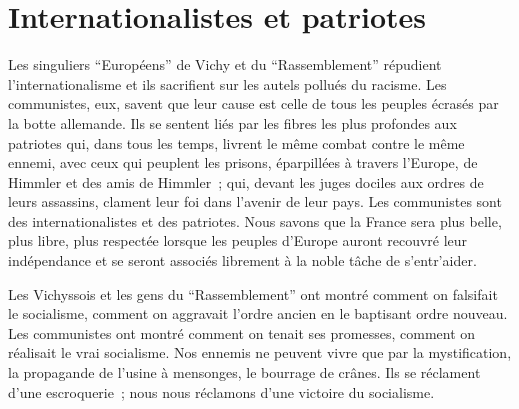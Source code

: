 \documentclass[french,twoside]{book} %
\begin{document}
\section[Internationalistes et patriotes]{Internationalistes et patriotes}
\noindent Les singuliers “Européens” de Vichy et du “Rassemblement” répudient l’internationalisme et ils sacrifient sur les autels pollués du racisme. Les communistes, eux, savent que leur cause est celle de tous les peuples écrasés par la botte allemande. Ils se sentent liés par les fibres les plus profondes aux patriotes qui, dans tous les temps, livrent le même combat contre le même ennemi, avec ceux qui peuplent les prisons, éparpillées à travers l’Europe, de Himmler et des amis de Himmler ; qui, devant les juges dociles aux ordres de leurs assassins, clament leur foi dans l’avenir de leur pays. Les communistes sont des internationalistes et des patriotes. Nous savons que la France sera plus belle, plus libre, plus respectée lorsque les peuples d’Europe auront recouvré leur indépendance et se seront associés librement à la noble tâche de s’entr’aider.\par
Les Vichyssois et les gens du “Rassemblement” ont montré comment on falsifait le socialisme, comment on aggravait l’ordre ancien en le baptisant ordre nouveau. Les communistes ont montré comment on tenait ses promesses, comment on réalisait le vrai socialisme. Nos ennemis ne peuvent vivre que par la mystification, la propagande de l’usine à mensonges, le bourrage de crânes. Ils se réclament d’une escroquerie ; nous nous réclamons d’une victoire du socialisme.
\end{document}
